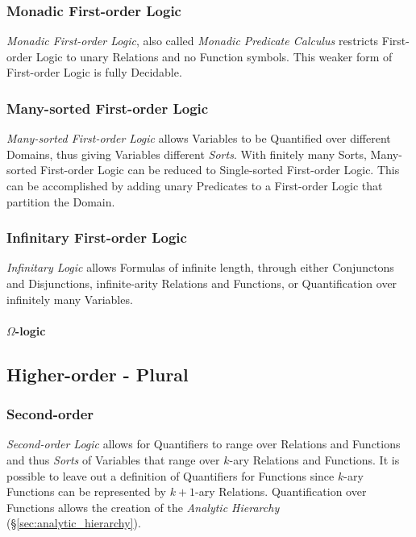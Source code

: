 \subsubsection{Monadic First-order Logic}

\emph{Monadic First-order Logic}, also called \emph{Monadic Predicate
  Calculus} restricts First-order Logic to unary Relations and no
Function symbols. This weaker form of First-order Logic is fully
Decidable.

\subsubsection{Many-sorted First-order Logic}\label{sec:manysorted_logic}

\emph{Many-sorted First-order Logic} allows Variables to be Quantified
over different Domains, thus giving Variables different
\emph{Sorts}. With finitely many Sorts, Many-sorted First-order Logic
can be reduced to Single-sorted First-order Logic. This can be
accomplished by adding unary Predicates to a First-order Logic that
partition the Domain.

\subsubsection{Infinitary First-order Logic}

\emph{Infinitary Logic} allows Formulas of infinite length, through
either Conjunctons and Disjunctions, infinite-arity Relations and
Functions, or Quantification over infinitely many Variables.

\paragraph{$\Omega$-logic}\label{sec:omega_logic}

\subsection{Higher-order - Plural}\label{sec:higher_order}

\subsubsection{Second-order}\label{sec:second_order}

\emph{Second-order Logic} allows for Quantifiers to range over
Relations and Functions and thus \emph{Sorts} of Variables that range
over $k$-ary Relations and Functions. It is possible to leave out a
definition of Quantifiers for Functions since $k$-ary Functions can be
represented by $k+1$-ary Relations.\cite{shapiro00} Quantification
over Functions allows the creation of the \emph{Analytic Hierarchy}
(\S\ref{sec:analytic_hierarchy}).

